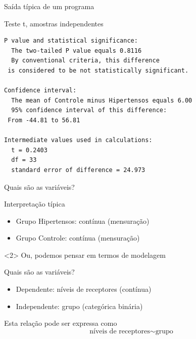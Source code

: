 \documentclass{beamer}
\begin{document}
\begin{frame}[fragile]{\scriptsize Saída típica de um programa}
  \begin{exampleblock}{Teste t, amostras independentes}
    \tiny
\begin{verbatim}
P value and statistical significance: 
  The two-tailed P value equals 0.8116 
  By conventional criteria, this difference
 is considered to be not statistically significant. 

Confidence interval: 
  The mean of Controle minus Hipertensos equals 6.00 
  95% confidence interval of this difference:
 From -44.81 to 56.81 

Intermediate values used in calculations: 
  t = 0.2403 
  df = 33 
  standard error of difference = 24.973 
\end{verbatim}
  \end{exampleblock}
\end{frame}


\begin{frame}{\scriptsize Quais são as variáveis?}
  \begin{block}{Interpretação típica}
    \begin{itemize}
    \footnotesize
    \item Grupo Hipertensos: contínua (mensuração)
    \smallskip
    \item Grupo Controle: contínua (mensuração)
    \end{itemize}
  \end{block}
  \vfill
  \begin{block}{}<2>
    Ou, podemos pensar em termos de modelagem
  \end{block}
\end{frame}

\begin{frame}{\scriptsize Quais são as variáveis?}
  \begin{itemize}
    \footnotesize
  \item Dependente: níveis de receptores (contínua)
    \smallskip
  \item Independente: grupo (categórica binária)
  \end{itemize}
  \vfill
  \begin{block}{Esta relação pode ser expressa como}
    \begin{displaymath}
      \text{níveis de receptores} \sim \text{grupo}
    \end{displaymath}
  \end{block}
\end{frame}
\end{document}
